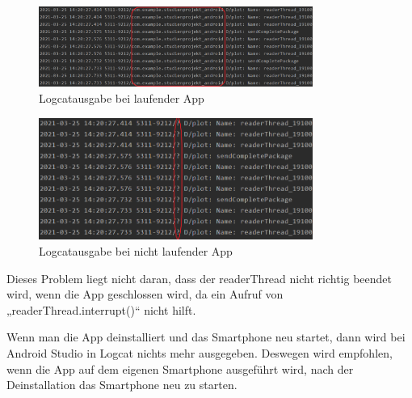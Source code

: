 \documentclass[12pt, onecolumn,notitlepage]{scrartcl}
\begin{document}
\begin{figure}[htbp] 
	\centering
	\includegraphics[width=0.8\textwidth]{Logcat_laufend.PNG}
	\caption{Logcatausgabe bei laufender App}
\end{figure}

\begin{figure}[htbp] 
	\centering
	\includegraphics[width=0.8\textwidth]{Logcat_nichtLaufend.PNG}
	\caption{Logcatausgabe bei nicht laufender App}
\end{figure}

Dieses Problem liegt nicht daran, dass der readerThread nicht richtig beendet wird, wenn die App geschlossen wird, da ein Aufruf von „readerThread.interrupt()“ nicht hilft.\par
Wenn man die App deinstalliert und das Smartphone neu startet, dann wird bei Android Studio in Logcat nichts mehr ausgegeben. Deswegen wird empfohlen, wenn die App auf dem eigenen Smartphone ausgeführt wird, nach der Deinstallation das Smartphone neu zu starten. 
\end{document}

